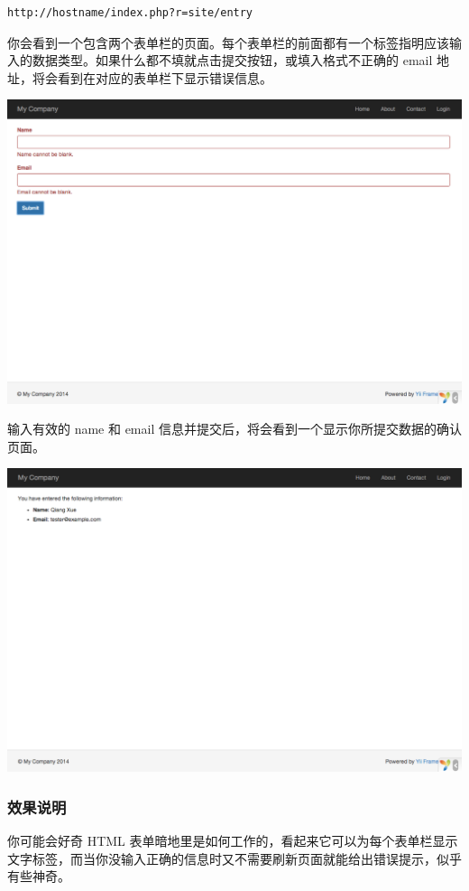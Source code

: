 \begin{lstlisting}
http://hostname/index.php?r=site/entry
\end{lstlisting}
你会看到一个包含两个表单栏的页面。每个表单栏的前面都有一个标签指明应该输入的数据类型。如果什么都不填就点击提交按钮，或填入格式不正确的 email 地址，将会看到在对应的表单栏下显示错误信息。

\noindent\includegraphics[width=\textwidth]{images/start-form-validation.png}

输入有效的 name 和 email 信息并提交后，将会看到一个显示你所提交数据的确认页面。

\noindent\includegraphics[width=\textwidth]{images/start-entry-confirmation.png}

\subsubsection{效果说明 \label{start-forms.md::magic-explained}}
你可能会好奇 HTML 表单暗地里是如何工作的，看起来它可以为每个表单栏显示文字标签，而当你没输入正确的信息时又不需要刷新页面就能给出错误提示，似乎有些神奇。

